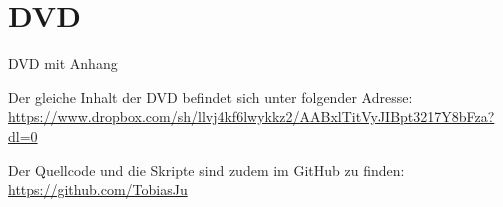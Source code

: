 \chapter*{DVD}



\begin{center}
{\Large DVD mit Anhang}

\bigskip


\bigskip

Der gleiche Inhalt der DVD befindet sich unter folgender Adresse:
\url{https://www.dropbox.com/sh/llvj4kf6lwykkz2/AABxlTitVyJIBpt3217Y8bFza?dl=0}

Der Quellcode und die Skripte sind zudem im GitHub zu finden:
\url{https://github.com/TobiasJu}

\end{center}
